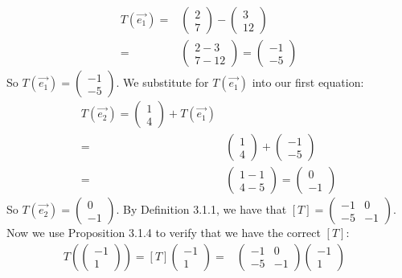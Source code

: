 \documentclass[12pt]{article}
\newenvironment{problem}[2][Problem]
{
	\begin{trivlist} 
		\item[\hskip \labelsep {\bfseries #1 #2:}]
	}
{
	\end{trivlist}
	}
\begin{document}
\begin{problem}{6}
\newpage
\noindent
\begin{align*}
T(\vec{e_{1}}) = &\begin{pmatrix}2\\7\end{pmatrix} - \begin{pmatrix}3\\12\end{pmatrix} \\
=& \begin{pmatrix}2-3\\7-12\end{pmatrix} = \begin{pmatrix} -1 \\-5\end{pmatrix}
\end{align*}
So $T(\vec{e_{1}}) = \begin{pmatrix} -1 \\-5\end{pmatrix}$. We substitute for $T(\vec{e_{1}})$ into our first equation:
\begin{align*}
T(\vec{e_{2}})=\begin{pmatrix}1\\4\end{pmatrix}+T(\vec{e_{1}})\\
=&\begin{pmatrix}1\\4\end{pmatrix} + \begin{pmatrix} -1 \\-5\end{pmatrix}\\
=& \begin{pmatrix} 1-1\\4-5\end{pmatrix} = \begin{pmatrix} 0\\ -1\end{pmatrix}
\end{align*}
So $T(\vec{e_{2}}) = \begin{pmatrix} 0 \\ -1\end{pmatrix}$. By Definition 3.1.1, we have that $[T] = \begin{pmatrix} -1 & 0\\ -5 & -1 \end{pmatrix}$. Now we use Proposition 3.1.4 to verify that we have the correct $[T]$:
\begin{align*}
T\left(\begin{pmatrix}-1\\1\end{pmatrix}\right)=[T]\begin{pmatrix}-1\\1\end{pmatrix}=&\begin{pmatrix} -1 & 0\\ -5 & -1 \end{pmatrix}\begin{pmatrix}-1\\1\end{pmatrix} &\\

\end{align*}
\end{problem}
\end{document}
